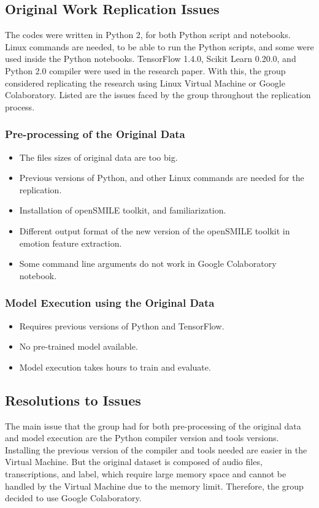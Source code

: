 \documentclass{article}
\newenvironment{subs}
  {\adjustwidth{3em}{0pt}}
  {\endadjustwidth}
\begin{document}
    \begin{subs}
    \subsection{Original Work Replication Issues}
    The codes were written in Python 2, for both Python script and notebooks. Linux commands are needed, to be able to run the Python scripts, and some were used inside the Python notebooks. TensorFlow 1.4.0, Scikit Learn 0.20.0, and Python 2.0 compiler were used in the research paper. With this, the group considered replicating the research using Linux Virtual Machine or Google Colaboratory. Listed are the issues faced by the group throughout the replication process.
        \begin{subs}
        \subsubsection*{Pre-processing of the Original Data}
        \begin{itemize}
            \item The files sizes of original data are too big.
            \item Previous versions of Python, and other Linux commands are needed for the replication.
            \item Installation of openSMILE toolkit, and familiarization.
            \item Different output format of the new version of the openSMILE toolkit in emotion feature extraction. 
            \item Some command line arguments do not work in Google Colaboratory notebook.
        \end{itemize}
        
        \subsubsection*{Model Execution using the Original Data}
        \begin{itemize}
            \item Requires previous versions of Python and TensorFlow.
            \item No pre-trained model available.
            \item Model execution takes hours to train and evaluate.
        \end{itemize}
        \end{subs}
    \subsection{Resolutions to Issues}
    The main issue that the group had for both pre-processing of the original data and model execution are the Python compiler version and tools versions. Installing the previous version of the compiler and tools needed are easier in the Virtual Machine. But the original dataset is composed of audio files, transcriptions, and label, which require large memory space and cannot be handled by the Virtual Machine due to the memory limit. Therefore, the group decided to use Google Colaboratory.\par
    

\end{subs}
\end{document}
